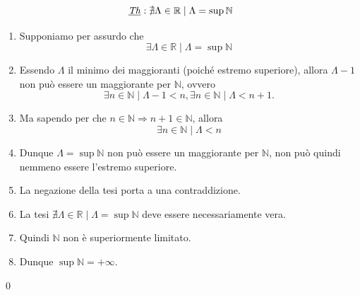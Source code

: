 \[ \underbar{\textit{Th}}: \nexists \Lambda\in\mathbb{R} \mid \Lambda=\sup\mathbb{N} \]

\begin{enumerate}[label=(\roman*)]
    \item Supponiamo per assurdo che 
        \[
            \exists \Lambda\in\mathbb{R} \mid \Lambda=\sup\mathbb{N}
        \]
    \item Essendo $\Lambda$ il minimo dei maggioranti (poiché estremo superiore),
    allora $\Lambda - 1$ non può essere un maggiorante per $\mathbb{N}$, ovvero
        \[
            \exists n\in\mathbb{N}\mid\Lambda-1<n,
            \exists n\in\mathbb{N}\mid\Lambda<n+1.
        \]

    \item Ma sapendo per  che $n\in\mathbb{N}\Rightarrow n+1\in\mathbb{N}$,
    allora
        \[
            \exists n\in\mathbb{N}\mid\Lambda<n
        \]
    \item Dunque $\Lambda=\sup\mathbb{N}$ non può essere un maggiorante per $\mathbb{N}$, non può quindi
    nemmeno essere l'estremo superiore.

    \item La negazione della tesi porta a una contraddizione.
    \item La tesi $\nexists \Lambda\in\mathbb{R} \mid \Lambda=\sup\mathbb{N}$ deve essere
    necessariamente vera.
    \item Quindi $\mathbb{N}$ non è superiormente limitato.
    \item Dunque $\sup\mathbb{N} = +\infty$.
\end{enumerate}
\qed